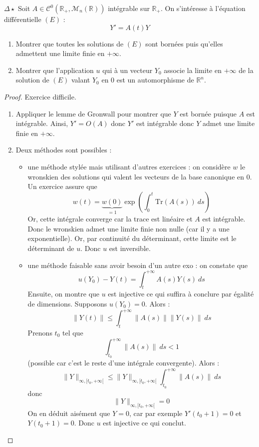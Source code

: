 \documentclass[french,a4paper]{article}
\newcommand{\R}{\mathbb{R}}
\newcommand{\Tr}{\text{Tr}}
\theoremstyle{plain}
\theoremstyle{definition}
\theoremstyle{remark}
\begin{document}
\begin{ex}[Moulin.32]{$\Delta\star$}
	Soit $A\in\mathcal{C}^0(\R_+,\mathcal{M}_n(\R))$ intégrable sur $\R_+$. On s'intéresse à l'équation différentielle $(E)$ : $$Y'=A(t)Y$$
	\begin{enumerate}
		\item Montrer que toutes les solutions de $(E)$ sont bornées puis qu'elles admettent une limite finie en $+\infty$.
		\item Montrer que l'application $u$ qui à un vecteur $Y_0$ associe la limite en $+\infty$ de la solution de $(E)$ valant $Y_0$ en $0$ est un automorphisme de $\R^n$.
	\end{enumerate}
\end{ex}
\begin{proof}
	Exercice difficile.
	\begin{enumerate}
		\item Appliquer le lemme de Gronwall pour montrer que $Y$ est bornée puisque $A$ est intégrable. Ainsi, $Y'=O(A)$ donc $Y'$ est intégrable donc $Y$ admet une limite finie en $+\infty$.
		\item Deux méthodes sont possibles :
		\begin{itemize}
			\item une méthode stylée mais utilisant d'autres exercices : on considère $w$ le wronskien des solutions qui valent les vecteurs de la base canonique en $0$. Un exercice assure que $$w(t)=\underbrace{w(0)}_{=1}\exp\left(\int_{0}^{t}\Tr(A(s))\ ds\right)$$ Or, cette intégrale converge car la trace est linéaire et $A$ est intégrable. Donc le wronskien admet une limite finie non nulle (car il y a une exponentielle). Or, par continuité du déterminant, cette limite est le déterminant de $u$. Donc $u$ est inversible.
			\item une méthode faisable sans avoir besoin d'un autre exo : on constate que $$u(Y_0)-Y(t)=\int_{t}^{+\infty}A(s)Y(s)\ ds$$ Ensuite, on montre que $u$ est injective ce qui suffira à conclure par égalité de dimensions. Supposons $u(Y_0)=0$. Alors : $$\lVert Y(t)\rVert\leqslant \int_{t}^{+\infty}\lVert A(s)\rVert\lVert Y(s)\rVert\ ds$$ Prenons $t_0$ tel que $$\int_{t_0}^{+\infty}\lVert A(s)\rVert\ ds <1$$ (possible car c'est le reste d'une intégrale convergente). Alors : $$\lVert Y\rVert_{\infty,[t_0,+\infty[}\leqslant\lVert Y\rVert_{\infty,[t_0,+\infty[}\int_{t_0}^{+\infty}\lVert A(s)\rVert\ ds$$ donc $$\lVert Y\rVert_{\infty,[t_0,+\infty[}=0$$ On en déduit aisément que $Y=0$, car par exemple $Y'(t_0+1)=0$ et $Y(t_0+1)=0$. Donc $u$ est injective ce qui conclut.
		\end{itemize}
	\end{enumerate}
\end{proof}
\end{document}
